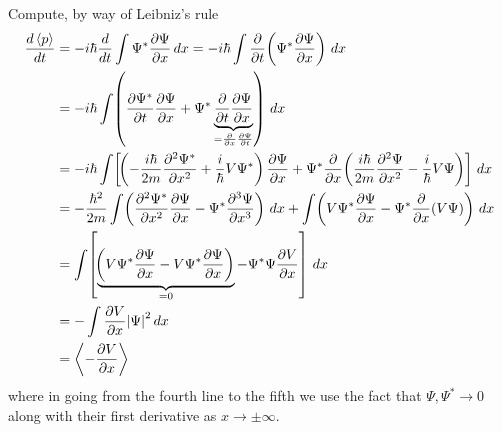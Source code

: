 \documentclass[a4paper]{article}
\begin{document}
Compute, by way of Leibniz's rule
\begin{align*}
	\frac{d \braket{p}}{d t} & = -i \hbar \frac{d }{d t}\int \Psi^{*}\frac{\partial \Psi}{\partial x} \, dx = -i \hbar \int \frac{\partial }{\partial t}\!\left( \Psi^{*}\frac{\partial \Psi}{\partial x} \right) \, dx \\
				 & = -i \hbar \int \!\left( \frac{\partial \Psi^{*}}{\partial t}\frac{\partial \Psi}{\partial x} + \Psi^{*}\underbrace{\frac{\partial }{\partial t}\frac{\partial \Psi}{\partial x}}_{= \frac{\partial }{\partial x}\frac{\partial \Psi}{\partial t}} \right) \, dx \\ 
				 & = -i \hbar \int \!\left[ \!\left( -\frac{i \hbar}{2m}\frac{\partial^2 \Psi^{*}}{\partial x^2} + \frac{i}{\hbar}V \Psi^{*} \right)\frac{\partial \Psi}{\partial x} + \Psi^{*}\frac{\partial }{\partial x}\!\left( \frac{i \hbar}{2m}\frac{\partial^2 \Psi}{\partial x^2} - \frac{i}{\hbar}V \Psi \right) \right] \, dx \\
	 & = -\frac{\hbar^{2}}{2m}\int \!\left( \frac{\partial^2 \Psi^{*}}{\partial x^2}\frac{\partial \Psi}{\partial x} - \Psi^{*}\frac{\partial^3 \Psi}{\partial x^3} \right) \, dx + \int \!\left( V \Psi^{*}\frac{\partial \Psi}{\partial x} - \Psi^{*}\frac{\partial }{\partial x}\!\left( V \Psi \right) \right) \, dx \\
	 & = \int \!\left[ \underbrace{\!\left( V \Psi^{*}\frac{\partial \Psi}{\partial x} - V \Psi^{*}\frac{\partial \Psi}{\partial x} \right)}_{= 0} - \Psi^{*}\Psi \frac{\partial V}{\partial x} \right] \, dx \\
	 & = -\int \frac{\partial V}{\partial x}\abs{\Psi}^{2} \, dx \\
	 & = \braket{-\frac{\partial V}{\partial x}}
\end{align*}
where in going from the fourth line to the fifth we use the fact that \( \Psi, \Psi^{*} \rightarrow 0 \) along with their first derivative as \( x \rightarrow \pm \infty \).

\vspace{12pt}

\end{document}
